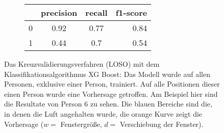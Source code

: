 \begin{figure}[ht]
  \begin{subfigure}{1\textwidth}
      \begin{center}
          \begin{tabular}{ | l | c | c | r | }
            \hline
             & precision & recall & f1-score \\ \hline
            0 & 0.92 & 0.77 & 0.84 \\ \hline
            1 & 0.44 & 0.7  & 0.54 \\
            \hline
          \end{tabular}
      \end{center}
  \end{subfigure}
    \caption{Das Kreuzvalidierungsverfahren (LOSO) mit dem Klassifikationsalgorithmus XG Boost: Das Modell wurde auf allen Personen, exklusive einer Person, trainiert. Auf alle Positionen dieser einen Person wurde eine Vorhersage getroffen. Am Beispiel hier sind die Resultate von Person 6 zu sehen. Die blauen Bereiche sind die, in denen die Luft angehalten wurde, die orange Kurve zeigt die Vorhersage ($w=$ Fenstergröße, $d=$ Verschiebung der Fenster).}
\label{evaluation:xgboost_loso:person6}
\end{figure}

